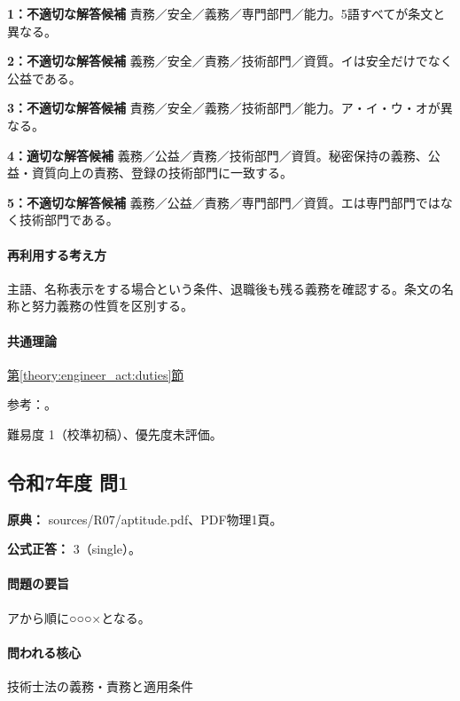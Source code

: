 \noindent\textbf{1：不適切な解答候補} 責務／安全／義務／専門部門／能力。5語すべてが条文と異なる。\par

\noindent\textbf{2：不適切な解答候補} 義務／安全／責務／技術部門／資質。イは安全だけでなく公益である。\par

\noindent\textbf{3：不適切な解答候補} 責務／安全／義務／技術部門／能力。ア・イ・ウ・オが異なる。\par

\noindent\textbf{4：適切な解答候補} 義務／公益／責務／技術部門／資質。秘密保持の義務、公益・資質向上の責務、登録の技術部門に一致する。\par

\noindent\textbf{5：不適切な解答候補} 義務／公益／責務／専門部門／資質。エは専門部門ではなく技術部門である。\par

\paragraph{再利用する考え方} 主語、名称表示をする場合という条件、退職後も残る義務を確認する。条文の名称と努力義務の性質を区別する。

\paragraph{共通理論} \hyperref[theory:engineer_act:duties]{第\ref*{theory:engineer_act:duties}節}

\par 参考：\cite{engineer_act_current}。

\par 難易度 1（校準初稿）、優先度未評価。

\subsection{令和7年度 問1}
\label{q:r07-reg-apt-01}

\noindent\textbf{原典：} sources/R07/aptitude.pdf、PDF物理1頁。

\textbf{公式正答：} 3（single）。

\paragraph{問題の要旨} アから順に○○○×となる。

\paragraph{問われる核心} 技術士法の義務・責務と適用条件

